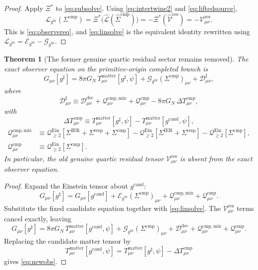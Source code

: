 \documentclass[11pt]{article}
\newcommand{\ObserverMap}{\Xi}
\newcommand{\ObserverMetric}{g^{\mathrm{br}}}
\newcommand{\CandidateMetric}{g^{\mathrm{cand}}}
\newcommand{\CompletedMetric}{g^{\sharp}}
\newcommand{\BaseShift}{\Sigma^{\mathrm{IER}}}
\newcommand{\ResponseShift}{\Sigma^{\mathrm{resp}}}
\newcommand{\CompShift}{\Sigma^{\mathrm{cmp}}}
\newcommand{\CompLift}{\widehat\Sigma^{\mathrm{cmp}}}
\newcommand{\ResidualCore}{\mathcal V_{\mu\nu}^{\mathrm{res}}}
\newcommand{\ResidualDec}{\mathcal D_{\mu\nu}^{\mathrm{dec}}}
\newcommand{\ResidualLift}{\widehat{\mathcal V}^{\mathrm{res}}}
\newcommand{\SubReducedEin}{\widehat{\mathcal L}}
\newcommand{\ReducedEin}{\mathcal L_{\ObserverMetric}}
\newcommand{\GaugeBook}{\mathcal G_{\ObserverMetric}}
\newcommand{\EinLin}{\mathcal E_{\ObserverMetric}}
\newcommand{\EinQuad}{\mathcal Q_{\ge 2}^{\mathrm{Ein}}}
\newcommand{\CompMix}{\mathcal Q_{\mu\nu}^{\mathrm{cmp,mix}}}
\newcommand{\CompQuad}{\mathcal Q_{\mu\nu}^{\mathrm{cmp}}}
\newcommand{\CompDec}{\mathcal D_{\mu\nu}^{\sharp}}
\newcommand{\DeltaTComp}{\Delta T_{\mu\nu}^{\mathrm{cmp}}}
\newtheorem{theorem}{Theorem}
\begin{document}
\begin{proof}
Apply \(\ObserverMap^*\) to \eqref{eq:subsolve}. Using \eqref{eq:intertwine2} and \eqref{eq:liftedsource},
\[
\ReducedEin(\CompShift)
=
\ObserverMap^*\bigl(\SubReducedEin(\CompLift)\bigr)
=
-\ObserverMap^*(\ResidualLift)
=
-\ResidualCore.
\]
This is \eqref{eq:observereq}, and \eqref{eq:linsolve} is the equivalent identity rewritten using \(\ReducedEin=\EinLin-\GaugeBook\).
\end{proof}

\begin{theorem}[The former genuine quartic residual sector remains removed]
\label{thm:removed}
The exact observer equation on the primitive-origin completed branch is
\begin{equation}
G_{\mu\nu}[\CompletedMetric]
=
8\pi G_N\,T_{\mu\nu}^{\mathrm{matter}}[\CompletedMetric,\psi]
+\GaugeBook(\CompShift)_{\mu\nu}
+\CompDec,
\label{eq:newobs}
\end{equation}
where
\begin{equation}
\CompDec
\equiv
\ResidualDec+\CompMix+\CompQuad-8\pi G_N\,\DeltaTComp,
\label{eq:compdec}
\end{equation}
with
\begin{equation}
\DeltaTComp
\equiv
T_{\mu\nu}^{\mathrm{matter}}[\CompletedMetric,\psi]
-T_{\mu\nu}^{\mathrm{matter}}[\CandidateMetric,\psi],
\label{eq:deltat}
\end{equation}
\begin{align}
\CompMix
&\equiv
\EinQuad[\BaseShift+\ResponseShift+\CompShift]
-\EinQuad[\BaseShift+\ResponseShift]
-\EinQuad[\CompShift],
\label{eq:compmix}
\\
\CompQuad
&\equiv
\EinQuad[\CompShift].
\label{eq:compquad}
\end{align}
In particular, the old genuine quartic residual tensor \(\ResidualCore\) is absent from the exact observer equation.
\end{theorem}

\begin{proof}
Expand the Einstein tensor about \(\CandidateMetric\):
\[
G_{\mu\nu}[\CompletedMetric]
=
G_{\mu\nu}[\CandidateMetric]
+\EinLin(\CompShift)_{\mu\nu}
+\CompMix+\CompQuad.
\]
Substitute the fixed candidate equation together with \eqref{eq:linsolve}. The \(\ResidualCore\) terms cancel exactly, leaving
\[
G_{\mu\nu}[\CompletedMetric]
=
8\pi G_N\,T_{\mu\nu}^{\mathrm{matter}}[\CandidateMetric,\psi]
+\GaugeBook(\CompShift)_{\mu\nu}
+\ResidualDec+\CompMix+\CompQuad.
\]
Replacing the candidate matter tensor by
\[
T_{\mu\nu}^{\mathrm{matter}}[\CandidateMetric,\psi]
=
T_{\mu\nu}^{\mathrm{matter}}[\CompletedMetric,\psi]-\DeltaTComp
\]
gives \eqref{eq:newobs}.
\end{proof}
\end{document}
